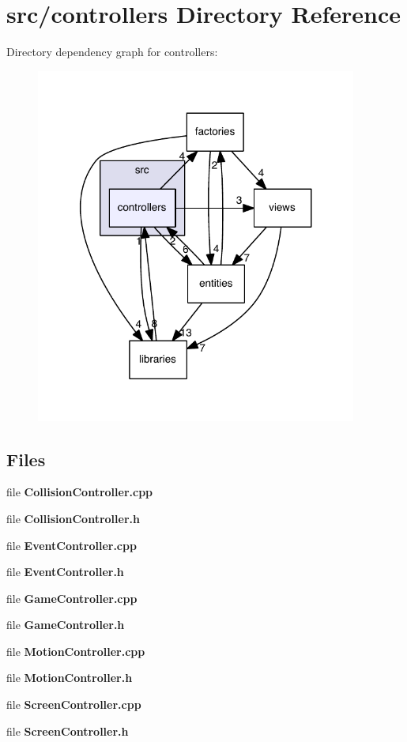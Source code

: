 \section{src/controllers Directory Reference}
\label{dir_bbd6674d859f4cefaacb708974cac240}
Directory dependency graph for controllers\-:\nopagebreak
\begin{figure}[H]
\begin{center}
\leavevmode
\includegraphics[width=299pt]{dir_bbd6674d859f4cefaacb708974cac240_dep}
\end{center}
\end{figure}
\subsection*{Files}
\begin{DoxyCompactItemize}
\item 
file {\bf Collision\-Controller.\-cpp}
\item 
file {\bf Collision\-Controller.\-h}
\item 
file {\bf Event\-Controller.\-cpp}
\item 
file {\bf Event\-Controller.\-h}
\item 
file {\bf Game\-Controller.\-cpp}
\item 
file {\bf Game\-Controller.\-h}
\item 
file {\bf Motion\-Controller.\-cpp}
\item 
file {\bf Motion\-Controller.\-h}
\item 
file {\bf Screen\-Controller.\-cpp}
\item 
file {\bf Screen\-Controller.\-h}
\end{DoxyCompactItemize}
